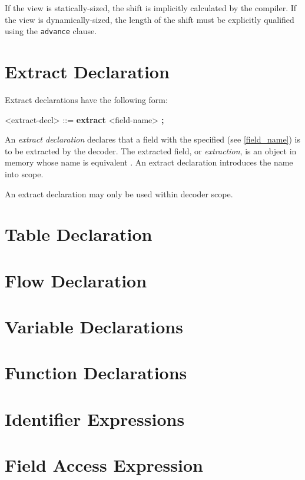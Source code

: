 If the view is statically-sized, the shift is implicitly calculated by the compiler. If the view is dynamically-sized, the length of the shift must be explicitly qualified using the \texttt{\color{blue}advance} clause. 

\section{Extract Declaration} \label{extract_guide}

Extract declarations have the following form:

\begin{grammar}
<extract-decl> ::=
\textbf{extract} <field-name> \textbf{;}
\end{grammar}

An \textit{extract declaration} declares that a field with the specified  (see \ref{field_name}) is to be extracted by the decoder. The extracted field, or \textit{extraction}, is an object in memory whose name is equivalent . An extract declaration introduces the name  into scope.

An extract declaration may only be used within decoder scope.

\section{Table Declaration} \label{table_guide}

\section{Flow Declaration} \label{flow_guide}

\section{Variable Declarations} \label{variable_guide}

\section{Function Declarations} \label{function_guide}

\section{Identifier Expressions} \label{id_expr_guide}

\section{Field Access Expression} \label{field_access_expr_guide}

